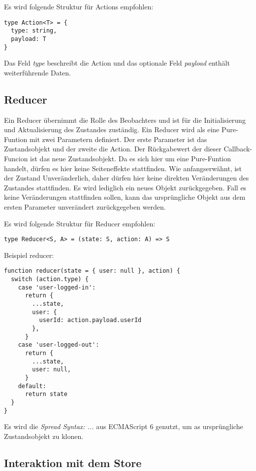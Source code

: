 Es wird folgende Struktur für Actions empfohlen:
\begin{lstlisting}
type Action<T> = {
  type: string,
  payload: T
}
\end{lstlisting}

Das Feld \textit{type} beschreibt die Action und das optionale Feld \textit{payload} enthält weiterführende Daten.

\subsection{Reducer}

Ein Reducer übernimmt die Rolle des Beobachters und ist für die Initialisierung und Aktualisierung des Zustandes zuständig. Ein Reducer wird als eine Pure-Funtion mit zwei Parametern definiert.
Der erste Parameter ist das Zustandsobjekt und der zweite die Action. Der Rückgabewert der dieser Callback-Funcion ist das neue Zustandsobjekt. Da es sich hier um eine Pure-Funtion handelt, dürfen es hier keine Seiteneffekte stattfinden. Wie anfangserwähnt, ist der Zustand Unveränderlich, daher dürfen hier keine direkten Veränderungen des Zustandes stattfinden. Es wird lediglich ein neues Objekt zurückgegeben. Fall es keine Veränderungen stattfinden sollen, kann das ursprüngliche Objekt aus dem ersten Parameter unverändert zurückgegeben werden.\cite{reduxStateActionReducers}

Es wird folgende Struktur für Reducer empfohlen:
\begin{lstlisting}
type Reducer<S, A> = (state: S, action: A) => S
\end{lstlisting}

Beispiel reducer:

\begin{lstlisting}
function reducer(state = { user: null }, action) {
  switch (action.type) {
    case 'user-logged-in':
      return {
        ...state,
        user: {
          userId: action.payload.userId
        },
      }
    case 'user-logged-out':
      return {
        ...state,
        user: null,
      }
    default:
      return state
  }
}
\end{lstlisting}

Es wird die \textit{Spread Syntax: ...} aus ECMAScript 6 genutzt, um as ursprüngliche Zustandsobjekt zu klonen.\cite{mdnSpreadSyntax}

\subsection{Interaktion mit dem Store}

